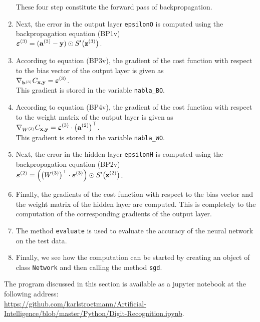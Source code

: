\begin{enumerate}
      These four step constitute the forward pass of backpropagation.
\item Next, the error in the output layer \texttt{epsilonO} is computed using the backpropagation equation
      (BP1v)
      \\[0.2cm]
      \hspace*{1.3cm}
      $\displaystyle \boldsymbol{\varepsilon}^{(3)} = (\mathbf{a}^{(3)} - \mathbf{y}) \odot S'\bigl(\mathbf{z}^{(3)}\bigr)$.
\item According to  equation (BP3v), the gradient of the cost function with respect to the bias vector of the
      output layer is given as
      \\[0.2cm]
      \hspace*{1.3cm}
      $\displaystyle \nabla_{\mathbf{b}^{(3)}} C_{\mathbf{x}, \mathbf{y}} = \boldsymbol{\varepsilon}^{(3)}$.
      \\[0.2cm]
      This gradient is stored in the variable \texttt{nabla\_BO}.
\item According to equation (BP4v), the gradient  of the cost function with respect to the weight matrix of the
      output layer is given as
      \\[0.2cm]
      \hspace*{1.3cm}
      $\displaystyle \nabla_{W^{(3)}} C_{\mathbf{x}, \mathbf{y}} = \boldsymbol{\varepsilon}^{(3)} \cdot \bigl(\mathbf{a}^{(2)}\bigr)^\top$.
      \\[0.2cm]
      This gradient is stored in the variable \texttt{nabla\_WO}.
\item Next, the error in the hidden layer \texttt{epsilonH} is computed using the backpropagation equation
      (BP2v)
      \\[0.2cm]
      \hspace*{1.3cm}
      $\displaystyle \boldsymbol{\varepsilon}^{(2)} = \Bigl(\bigl(W^{(3)}\bigr)^\top \cdot \boldsymbol{\varepsilon}^{(3)}\Bigr) \odot
           S'\bigl(\mathbf{z}^{(2)}\bigr)
      $.
\item Finally, the gradients of the cost function with respect to the bias
      vector and the weight matrix of the hidden layer are computed.  This is completely to the computation of
      the corresponding gradients of the output layer.
\item The method \texttt{evaluate} is used to evaluate the accuracy of the neural network on the test data.
\item Finally, we see how the computation can be started by creating an object of class \texttt{Network} and
      then calling the method \texttt{sgd}.
\end{enumerate}
The program discussed in this section is available as a jupyter notebook at the following address:
\\[0.2cm]
\hspace*{0.3cm}
\href{https://github.com/karlstroetmann/Artificial-Intelligence/blob/master/Python/Digit-Recognition.ipynb}{https://github.com/karlstroetmann/Artificial-Intelligence/blob/master/Python/Digit-Recognition.ipynb}.





